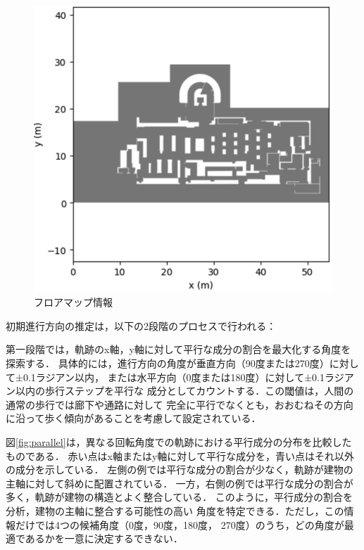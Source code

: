 \begin{figure}[H]
	\centering
	\includegraphics[width=\linewidth]{../image/floor-map.jpg}
  \caption{フロアマップ情報} \label{fig:floor-map}
\end{figure}

初期進行方向の推定は，以下の2段階のプロセスで行われる：

第一段階では，軌跡のx軸，y軸に対して平行な成分の割合を最大化する角度を探索する．
具体的には，進行方向の角度が垂直方向（90度または270度）に対して±0.1ラジアン以内，
または水平方向（0度または180度）に対して±0.1ラジアン以内の歩行ステップを平行な
成分としてカウントする．この閾値は，人間の通常の歩行では廊下や通路に対して
完全に平行でなくとも，おおむねその方向に沿って歩く傾向があることを考慮して設定されている．

図\ref{fig:parallel}は，異なる回転角度での軌跡における平行成分の分布を比較したものである．
赤い点はx軸またはy軸に対して平行な成分を，青い点はそれ以外の成分を示している．
左側の例では平行な成分の割合が少なく，軌跡が建物の主軸に対して斜めに配置されている．
一方，右側の例では平行な成分の割合が多く，軌跡が建物の構造とよく整合している．
このように，平行成分の割合を分析，建物の主軸に整合する可能性の高い
角度を特定できる．ただし，この情報だけでは4つの候補角度（0度，90度，180度，
270度）のうち，どの角度が最適であるかを一意に決定するできない．

